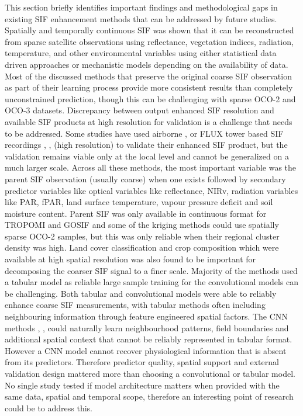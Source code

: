 This section briefly identifies important findings and methodological gaps in existing SIF enhancement methods that can be addressed by future studies. Spatially and temporally continuous SIF was shown that it can be reconstructed from sparse satellite observations using reflectance, vegetation indices, radiation, temperature, and other environmental variables using either statistical data driven approaches or mechanistic models depending on the availability of data. Most of the discussed methods that preserve the original coarse SIF observation as part of their learning process provide more consistent results than completely unconstrained prediction, though this can be challenging with sparse OCO-2 and OCO-3 datasets. Discrepancy between output enhanced SIF resolution and available SIF products at high resolution for validation is a challenge that needs to be addressed. Some studies have used airborne \cite{yu2019high}, \cite{yu2025dosif}  or FLUX tower based SIF recordings \cite{hu2024spatially}, \cite{chen2025improved}, \cite{du2025cnsif} (high resolution) to validate their enhanced SIF product, but the validation remains viable only at the local level and cannot be generalized on a much larger scale. Across all these methods, the most important variable was the parent SIF observation (usually coarse) when one exists followed by secondary predictor variables like optical variables like reflectance, NIRv, radiation variables like PAR, fPAR, land surface temperature, vapour pressure deficit and soil moisture content. Parent SIF was only available in continuous format for TROPOMI and GOSIF \cite{li2019global} and some of the kriging methods could use spatially sparse OCO-2 samples, but this was only reliable when their regional cluster density was high. Land cover classification and crop composition which were available at high spatial resolution was also found to be important for decomposing the coarser SIF signal to a finer scale. Majority of the methods used a tabular model as reliable large sample training for the convolutional models can be challenging. Both tabular and convolutional models were able to reliably enhance coarse SIF measurements, with tabular methods often including neighbouring information through feature engineered spatial factors. The CNN methods \cite{gensheimer2022convolutional}, \cite{du2025cnsif}, \cite{zhang2020downscaling} could naturally learn neighbourhood patterns, field boundaries and additional spatial context that cannot be reliably represented in tabular format. However a CNN model cannot recover physiological information that is absent from its predictors. Therefore predictor quality, spatial support and external validation design mattered more than choosing a convolutional or tabular model. No single study tested if model architecture matters when provided with the same data, spatial and temporal scope, therefore an interesting point of research could be to address this.

